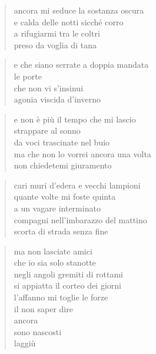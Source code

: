 \clearpage


\begin{verse}
    ancora mi seduce la sostanza oscura\\
    e calda delle notti sicché corro\\
    a rifugiarmi tra le coltri\\
    preso da voglia di tana
\end{verse}

\begin{verse}
    e che siano serrate a doppia mandata\\
    le porte\\
    che non vi s'insinui\\
    agonia viscida d'inverno
\end{verse}

\begin{verse}
    e non è più il tempo che mi lascio\\
    strappare al sonno\\
    da voci trascinate nel buio\\
    ma che non lo vorrei ancora una volta\\
    non chiedetemi giuramento
\end{verse}

\clearpage


\begin{verse}
    cari muri d'edera e vecchi lampioni\\
    quante volte mi foste quinta\\
    a un vagare interminato\\
    compagni nell'imbarazzo del mattino\\
    scorta di strada senza fine
\end{verse}

\begin{verse}
    ma non lasciate amici\\
    che io sia solo stanotte\\
    negli angoli gremiti di rottami\\
    si appiatta il corteo dei giorni\\
    l'affanno mi toglie le forze\\
    il non saper dire\\
    ancora\\
    sono nascosti\\
    laggiù
\end{verse}


